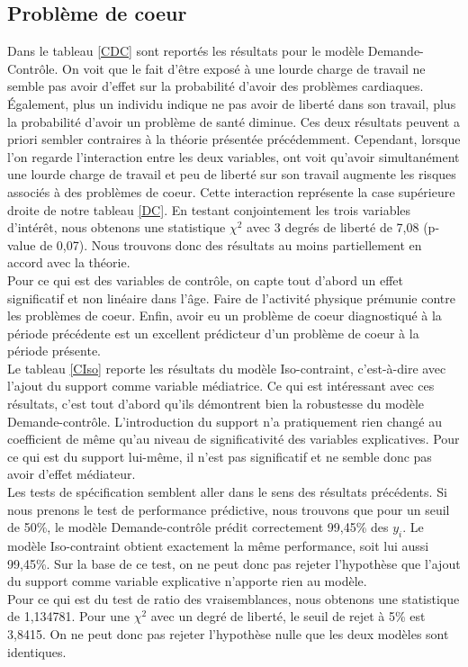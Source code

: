 \documentclass[a4paper, oneside, titlepage]{article}
\begin{document}
\subsection{Problème de coeur}
Dans le tableau \ref{CDC} sont reportés les résultats pour le modèle Demande-Contrôle. On voit que le fait d'être exposé à une lourde charge de travail ne semble pas avoir d'effet sur la probabilité d'avoir des problèmes cardiaques. Également, plus un individu indique ne pas avoir de liberté dans son travail, plus la probabilité d'avoir un problème de santé diminue. Ces deux résultats peuvent a priori sembler contraires à la théorie présentée précédemment. Cependant, lorsque l'on regarde l'interaction entre les deux variables, ont voit qu'avoir simultanément une lourde charge de travail et peu de liberté sur son travail augmente les risques associés à des problèmes de coeur. Cette interaction représente la case supérieure droite de notre tableau \ref{DC}. En testant conjointement les trois variables d'intérêt, nous obtenons une statistique $\chi^2$ avec 3 degrés de liberté de 7,08 (p-value de 0,07). Nous trouvons donc des résultats au moins partiellement en accord avec la théorie.
\\
Pour ce qui est des variables de contrôle, on capte tout d'abord un effet significatif et non linéaire dans l'âge. Faire de l'activité physique prémunie contre les problèmes de coeur. Enfin, avoir eu un problème de coeur diagnostiqué à la période précédente est un excellent prédicteur d'un problème de coeur à la période présente.
\\
Le tableau \ref{CIso} reporte les résultats du modèle Iso-contraint, c'est-à-dire avec l'ajout du support comme variable médiatrice. Ce qui est intéressant avec ces résultats, c'est tout d'abord qu'ils démontrent bien la robustesse du modèle Demande-contrôle. L'introduction du support n'a pratiquement rien changé au coefficient de même qu'au niveau de significativité des variables explicatives. Pour ce qui est du support lui-même, il n'est pas significatif et ne semble donc pas avoir d'effet médiateur.
\\
Les tests de spécification semblent aller dans le sens des résultats précédents. Si nous prenons le test de performance prédictive, nous trouvons que pour un seuil de 50\%, le modèle Demande-contrôle prédit correctement 99,45\% des $y_i$. Le modèle Iso-contraint obtient exactement la même performance, soit lui aussi 99,45\%. Sur la base de ce test, on ne peut donc pas rejeter l'hypothèse que l'ajout du support comme variable explicative n'apporte rien au modèle.
\\
Pour ce qui est du test de ratio des vraisemblances, nous obtenons une statistique de 1,134781. Pour une $\chi^2$ avec un degré de liberté, le seuil de rejet à 5\% est 3,8415. On ne peut donc pas rejeter l'hypothèse nulle que les deux modèles sont identiques.
\end{document}
